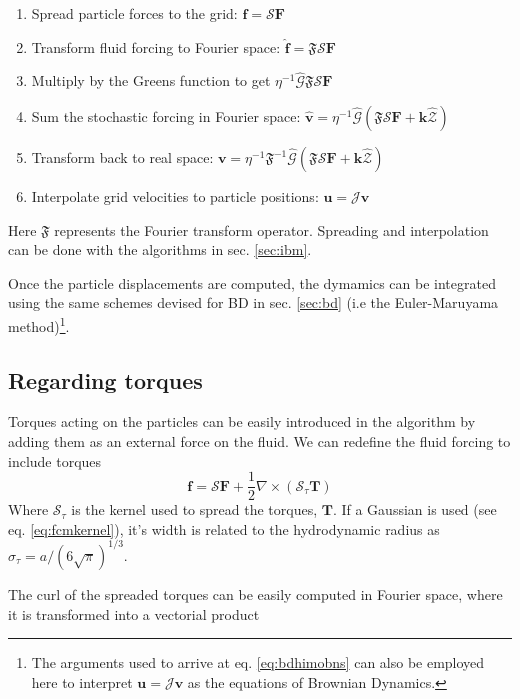 \documentclass[ twoside,openright,titlepage,numbers=noenddot,%
headinclude,footinclude,cleardoublepage=empty,abstract=on,
BCOR=5mm,paper=a4,fontsize=11pt, dvipsnames
]{scrreprt}
\renewcommand{\vec}[1]{\bm{#1}}
\newcommand{\tens}[1]{\bm{\mathcal{#1}}}
\newcommand{\oper}[1]{\mathcal{#1}}
\newcommand{\half}{\frac{1}{2}}
\newcommand{\fou}[1]{\widehat{#1}}
\newcommand{\pvel}{u}
\newcommand{\fvel}{v}
\begin{document}
\begin{enumerate}
\item Spread particle forces to the grid: $\vec{f} = \oper{S}\vec{F}$
\item Transform fluid forcing to Fourier space: $\fou{\vec{f}} = \mathfrak{F}\oper{S}\vec{F}$
\item Multiply by the Greens function to get $\eta^{-1}\fou{\tens{G}}\mathfrak{F}\oper{S}\vec{F}$
\item Sum the stochastic forcing in Fourier space: $\fou{\vec{\fvel}} = \eta^{-1}\fou{\tens{G}}(\mathfrak{F}\oper{S}\vec{F} + \vec{k}\fou{\mathcal{Z}})$
\item Transform back to real space: $\vec{\fvel} = \eta^{-1}\mathfrak{F}^{-1}\fou{\tens{G}}(\mathfrak{F}\oper{S}\vec{F} + \vec{k}\fou{\mathcal{Z}})$
\item Interpolate grid velocities to particle positions: $\vec{\pvel} = \oper{J}\vec{\fvel}$
\end{enumerate}
Here $\mathfrak{F}$ represents the Fourier transform operator.
Spreading and interpolation can be done with the algorithms in sec. \ref{sec:ibm}.

Once the particle displacements are computed, the dymamics can be integrated using the same schemes devised for \gls{BD} in sec. \ref{sec:bd} (i.e the Euler-Maruyama method)\footnote{The arguments used to arrive at eq. \eqref{eq:bdhimobns} can also be employed here to interpret $\vec{\pvel}=\oper{J}\vec{\fvel}$ as the equations of Brownian Dynamics.}.

\subsection*{Regarding torques}

Torques acting on the particles can be easily introduced in the algorithm by adding them as an external force on the fluid. We can redefine the fluid forcing to include torques
\begin{equation}
\vec{f} = \oper{S}\vec{F} + \half\nabla\times(\oper{S}_\tau\vec{T})
\end{equation}
Where $\oper{S}_\tau$ is the kernel used to spread the torques, $\vec{T}$. If a Gaussian is used (see eq. \eqref{eq:fcmkernel}), it's width is related to the hydrodynamic radius as $\sigma_\tau = a/(6\sqrt{\pi})^{1/3}$.

The curl of the spreaded torques can be easily computed in Fourier space, where it is transformed into a vectorial product
\end{document}
